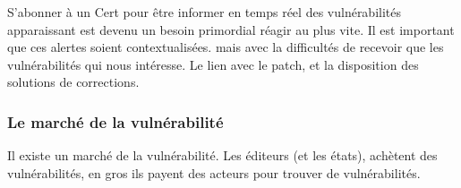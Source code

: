 S’abonner à un Cert pour être informer en temps réel des vulnérabilités apparaissant est devenu un besoin primordial réagir au plus vite. Il est important que ces alertes soient contextualisées.  mais avec la difficultés de recevoir que les vulnérabilités qui nous intéresse. Le lien avec le patch, et la disposition des solutions de corrections.


\subsubsection{Le marché de la vulnérabilité}

Il existe un marché de la vulnérabilité. Les éditeurs (et les états), achètent des vulnérabilités, en gros ils payent des acteurs pour trouver de vulnérabilités.




 

